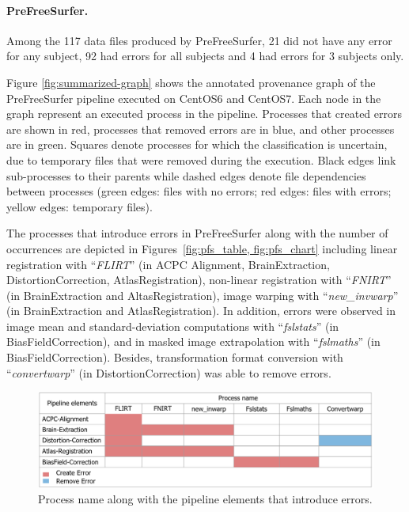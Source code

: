 \documentclass{article}
\begin{document}
{\paragraph{PreFreeSurfer.} Among the 117 data files produced by 
PreFreeSurfer, 21 did not have any error for any subject, 92 had errors 
for all subjects and 4 had errors for 3 subjects only. 

Figure \ref{fig:summarized-graph} shows the annotated provenance graph 
of the PreFreeSurfer pipeline executed on CentOS6 and CentOS7. Each 
node in the graph represent an executed process in the pipeline. 
Processes that created errors are shown in red, processes that removed 
errors are in blue, and other processes are in green.  Squares denote 
processes for which the classification is uncertain, due to temporary 
files that were removed during the execution. Black edges link 
sub-processes to their parents while dashed edges denote file 
dependencies between processes (green edges: files with no errors; red 
edges: files with errors; yellow edges: temporary files).

The processes that introduce errors in PreFreeSurfer along with the 
number of occurrences are depicted in Figures~\ref{fig:pfs_table, 
fig:pfs_chart} including linear registration with “\emph{FLIRT}” (in 
ACPC Alignment, BrainExtraction, DistortionCorrection, 
AtlasRegistration), non-linear registration with “\emph{FNIRT}” (in 
BrainExtraction and AltasRegistration), image warping with 
“\emph{new\_invwarp}” (in BrainExtraction and AtlasRegistration).  In 
addition, errors were observed in image mean and standard-deviation 
computations with “\emph{fslstats}” (in BiasFieldCorrection), and in 
masked image extrapolation with “\emph{fslmaths}” (in 
BiasFieldCorrection).  Besides, transformation format conversion with 
“\emph{convertwarp}” (in DistortionCorrection) was able to remove 
errors.

\begin{figure}[H]
\centering
  \includegraphics[scale=0.5]{images/pfs_table.png}
  \caption{Process name along with the pipeline elements that introduce errors.}
  \label{fig:pfs_table}
\end{figure}

}
\end{document}
